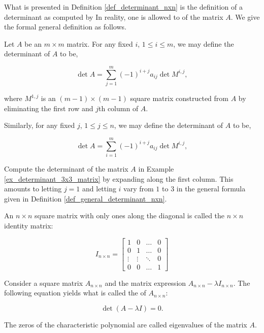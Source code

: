 What is presented in Definition \ref{def_determinant_nxn} is the definition of a determinant as computed by   In reality, one is allowed to  of the matrix $A$.  We give the formal general definition as follows.

{Let $A$ be an $m\times m$ matrix.  For any fixed $i$, $1\leq i\leq m$,  we may define the determinant of $A$ to be,
 
\[\det A = \sum_{j=1}^m (-1)^{i+j} a_{ij}\det M^{i,j},\]

\noindent where $M^{1,j}$ is an $(m-1)\times (m-1)$ square matrix constructed from $A$ by eliminating the first row and $j$th column of $A$.

Similarly, for any fixed $j$, $1\leq j\leq n$, we may define the determinant of $A$ to be,

\[\det A = \sum_{i=1}^m (-1)^{i+j} a_{ij}\det M^{i,j},\]
}

{Compute the determinant of the matrix $A$ in Example \ref{ex_determinant_3x3_matrix} by expanding along the first column.}
{This amounts to letting $j=1$ and letting $i$ vary from $1$ to $3$ in the general formula given in Definition \ref{def_general_determinant_nxn}.}


An $n\times n$ square matrix with only ones along the diagonal is called the $n\times n$ identity matrix:

\[
I_{n\times n} = \begin{bmatrix}
	1 & 0 &\dots & 0\\
	0 & 1 &\dots & 0\\
	\vdots & \vdots & \ddots & 0\\
	0 & 0 &\dots & 1
\end{bmatrix}
\]

Consider a square matrix $A_{n\times n}$ and the matrix expression $A_{n\times n}-\lambda I_{n\times n}$.  The following equation yields what is called the  of  $A_{n \times n}$:

\[\det (A-\lambda I) = 0.\]

The zeros of the characteristic polynomial are called eigenvalues of the matrix $A$.  

